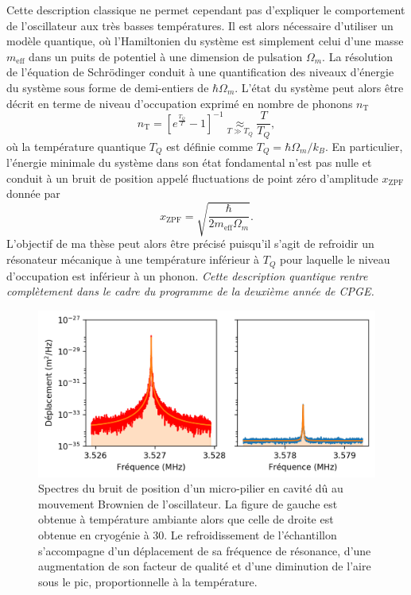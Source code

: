 \documentclass[12pt,a4paper]{article}
\begin{document}
Cette description classique ne permet cependant pas d'expliquer le comportement de l'oscillateur aux très basses températures.
Il est alors nécessaire d'utiliser un modèle quantique, où l'Hamiltonien du système est simplement celui d'une masse $m_\mathrm{eff}$ dans un puits de potentiel à une dimension de pulsation $\Omega_m$.
La résolution de l'équation de Schrödinger conduit à une quantification des niveaux d'énergie du système sous forme de demi-entiers de $\hbar\Omega_m$.
L'état du système peut alors être décrit en terme de niveau d'occupation exprimé en nombre de phonons $n_\mathrm{T}$
\begin{equation}
n_\mathrm{T} = \left[ e^\frac{T_Q}{T} -1\right]^{-1} \underset{T\gg T_Q}{\approx} \frac{T}{T_Q},
\end{equation}
où la température quantique $T_Q$ est définie comme $T_Q = \hbar\Omega_m/k_B$.
En particulier, l'énergie minimale du système dans son état fondamental n'est pas nulle et conduit à un bruit de position appelé fluctuations de point zéro d'amplitude $x_\mathrm{ZPF}$ donnée par
\begin{equation}
x_\mathrm{ZPF}=\sqrt{\frac{\hbar}{2m_\mathrm{eff}\Omega_m}}.
\end{equation}
L'objectif de ma thèse peut alors être précisé puisqu'il s'agit de refroidir un résonateur mécanique à une température inférieur à $T_Q$ pour laquelle le niveau d'occupation est inférieur à un phonon.
\emph{Cette description quantique rentre complètement dans le cadre du programme de la deuxième année de CPGE.}

\begin{figure}
\center
\includegraphics[scale=0.75]{figures/thermal_peak_def_filled.png}
\caption{Spectres du bruit de position d'un micro-pilier en cavité dû au mouvement Brownien de l'oscillateur.
La figure de gauche est obtenue à température ambiante alors que celle de droite est obtenue en cryogénie à \unit{30}{\milli\kelvin}.
Le refroidissement de l'échantillon s'accompagne d'un déplacement de sa fréquence de résonance, d'une augmentation de son facteur de qualité et d'une diminution de l'aire sous le pic, proportionnelle à la température.}
\end{figure}
\end{document}
